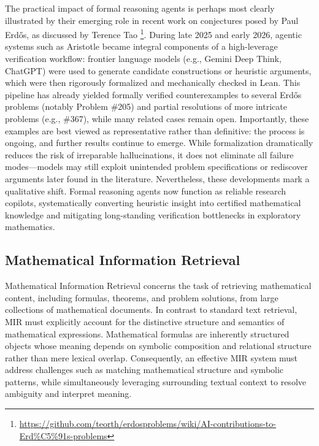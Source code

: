 \documentclass[11pt]{article}
\numberwithin{equation}{section}
\begin{document}
The practical impact of formal reasoning agents is perhaps most clearly illustrated by their emerging role in recent work on conjectures posed by Paul Erdős, as discussed by Terence Tao \footnote{\href{https://github.com/teorth/erdosproblems/wiki/AI-contributions-to-Erd\%C5\%91s-problems}
     {https://github.com/teorth/erdosproblems/wiki/AI-contributions-to-Erd\%C5\%91s-problems}}. During late 2025 and early 2026, agentic systems such as Aristotle became integral components of a high-leverage verification workflow: frontier language models (e.g., Gemini Deep Think, ChatGPT) were used to generate candidate constructions or heuristic arguments, which were then rigorously formalized and mechanically checked in Lean. This pipeline has already yielded formally verified counterexamples to several Erdős problems (notably Problem \#205) and partial resolutions of more intricate problems (e.g., \#367), while many related cases remain open. Importantly, these examples are best viewed as representative rather than definitive: the process is ongoing, and further results continue to emerge. While formalization dramatically reduces the risk of irreparable hallucinations, it does not eliminate all failure modes—models may still exploit unintended problem specifications or rediscover arguments later found in the literature. Nevertheless, these developments mark a qualitative shift. Formal reasoning agents now function as reliable research copilots, systematically converting heuristic insight into certified mathematical knowledge and mitigating long-standing verification bottlenecks in exploratory mathematics.

\subsection{Mathematical Information Retrieval}\label{subsec:mir}

Mathematical Information Retrieval concerns the task of retrieving mathematical content, including formulas, theorems, and problem solutions, from large collections of mathematical documents. In contrast to standard text retrieval, MIR must explicitly account for the distinctive structure and semantics of mathematical expressions. Mathematical formulas are inherently structured objects whose meaning depends on symbolic composition and relational structure rather than mere lexical overlap. Consequently, an effective MIR system must address challenges such as matching mathematical structure and symbolic patterns, while simultaneously leveraging surrounding textual context to resolve ambiguity and interpret meaning.
\end{document}
